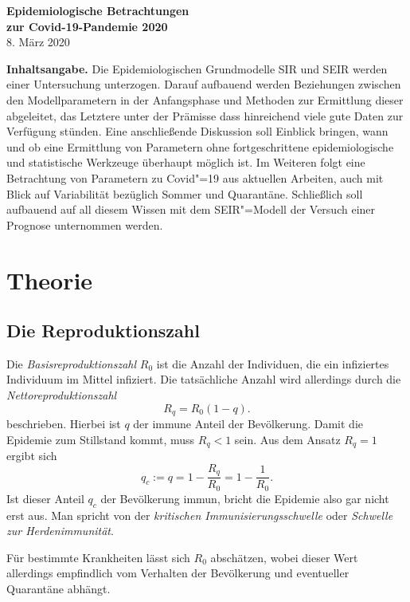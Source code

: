 \documentclass[a4paper,11pt,fleqn,twocolumn,twoside,dvipdfmx]{scrartcl}
\numberwithin{equation}{section}
\newcommand{\strong}[1]{\textbf{#1}}
\begin{document}
\noindent
{\Large\textbf{Epidemiologische Betrachtungen\\
zur Covid-19-Pandemie 2020}}\\[4pt]
8. März 2020

\tableofcontents

\vspace{1.2em}
\noindent\strong{Inhaltsangabe.}
Die Epidemiologischen Grundmodelle SIR und SEIR werden einer
Untersuchung unterzogen. Darauf aufbauend werden Beziehungen zwischen
den Modellparametern in der Anfangsphase und Methoden zur Ermittlung
dieser abgeleitet, das Letztere unter der Prämisse dass hinreichend
viele gute Daten zur Verfügung stünden. Eine anschließende Diskussion
soll Einblick bringen, wann und ob eine Ermittlung von Parametern ohne
fortgeschrittene epidemiologische und statistische Werkzeuge überhaupt
möglich ist. Im Weiteren folgt eine Betrachtung von Parametern zu
Covid"=19 aus aktuellen Arbeiten, auch mit Blick auf Variabilität
bezüglich Sommer und Quarantäne. Schließlich soll aufbauend auf all
diesem Wissen mit dem SEIR"=Modell der Versuch einer Prognose
unternommen werden.

\section{Theorie}

\subsection{Die Reproduktionszahl}

Die \emph{Basisreproduktionszahl} $R_0$ ist die Anzahl der Individuen,
die ein infiziertes Individuum im Mittel infiziert. Die tatsächliche
Anzahl wird allerdings durch die \emph{Nettoreproduktionszahl}%
\begin{equation}\label{eq:Nettoreproduktionszahl}
R_q = R_0(1-q).
\end{equation}
beschrieben. Hierbei ist $q$ der immune Anteil der Bevölkerung.
Damit die Epidemie zum Stillstand kommt, muss $R_q<1$ sein.
Aus dem Ansatz $R_q=1$ ergibt sich%
\begin{equation}
q_c := q = 1-\frac{R_q}{R_0} = 1-\frac{1}{R_0}.
\end{equation}
Ist dieser Anteil $q_c$ der Bevölkerung immun, bricht die Epidemie
also gar nicht erst aus. Man spricht von der
\emph{kritischen Immunisierungsschwelle} oder \emph{Schwelle
zur Herdenimmunität}.

Für bestimmte Krankheiten lässt sich $R_0$ abschätzen, wobei
dieser Wert allerdings empfindlich vom Verhalten der Bevölkerung und
eventueller Quarantäne abhängt.
\end{document}
